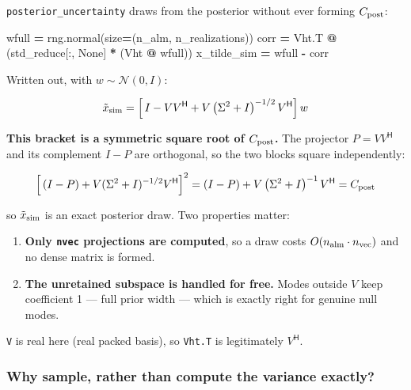 \documentclass[
  11pt,
]{article}
\newenvironment{Shaded}{\begin{snugshade}}{\end{snugshade}}
\newcommand{\NormalTok}[1]{#1}
\newcommand{\OperatorTok}[1]{\textcolor[rgb]{0.81,0.36,0.00}{\textbf{#1}}}
\newcommand{\VariableTok}[1]{\textcolor[rgb]{0.00,0.00,0.00}{#1}}
\providecommand{\tightlist}{%
  \setlength{\itemsep}{0pt}\setlength{\parskip}{0pt}}
\begin{document}
\texttt{posterior\_uncertainty} draws from the posterior without ever
forming \(C_{\rm post}\):

\begin{Shaded}
\begin{Highlighting}[]
\NormalTok{wfull }\OperatorTok{=}\NormalTok{ rng.normal(size}\OperatorTok{=}\NormalTok{(n\_alm, n\_realizations))}
\NormalTok{corr }\OperatorTok{=}\NormalTok{ Vht.T }\OperatorTok{@}\NormalTok{ (std\_reduce[:, }\VariableTok{None}\NormalTok{] }\OperatorTok{*}\NormalTok{ (Vht }\OperatorTok{@}\NormalTok{ wfull))}
\NormalTok{x\_tilde\_sim }\OperatorTok{=}\NormalTok{ wfull }\OperatorTok{{-}}\NormalTok{ corr}
\end{Highlighting}
\end{Shaded}

Written out, with \(w \sim \mathcal{N}(0, I)\):

\[ \tilde{x}_{\rm sim} = \Big[\,I - VV^{\mathsf H} + V\left(\Sigma^2+I\right)^{-1/2}V^{\mathsf H}\Big]\,w \]

\textbf{This bracket is a symmetric square root of \(C_{\rm post}\).}
The projector \(P = VV^{\mathsf H}\) and its complement \(I - P\) are
orthogonal, so the two blocks square independently:

\[ \Big[\,(I - P) + V(\Sigma^2+I)^{-1/2}V^{\mathsf H}\Big]^2 = (I-P) + V\left(\Sigma^2+I\right)^{-1}V^{\mathsf H} = C_{\rm post} \]

so \(\tilde{x}_{\rm sim}\) is an exact posterior draw. Two properties
matter:

\begin{enumerate}
\def\labelenumi{\arabic{enumi}.}
\tightlist
\item
  \textbf{Only \texttt{nvec} projections are computed}, so a draw costs
  \(O(n_{\rm alm}\cdot n_{\rm vec})\) and no dense matrix is formed.
\item
  \textbf{The unretained subspace is handled for free.} Modes outside
  \(V\) keep coefficient 1 --- full prior width --- which is exactly
  right for genuine null modes.
\end{enumerate}

\texttt{V} is real here (real packed basis), so \texttt{Vht.T} is
legitimately \(V^{\mathsf H}\).

\hypertarget{why-sample-rather-than-compute-the-variance-exactly}{%
\subsubsection{Why sample, rather than compute the variance
exactly?}\label{why-sample-rather-than-compute-the-variance-exactly}}
\end{document}
